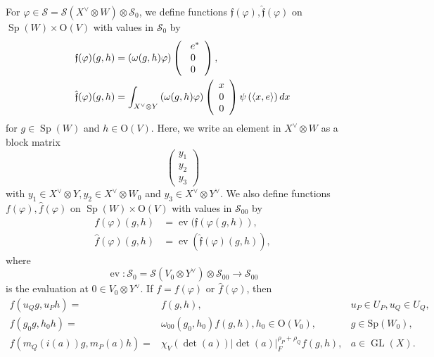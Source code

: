 \documentclass[article]{article}
\numberwithin{equation}{section}
\theoremstyle{definition}
\DeclareMathOperator{\GL}{GL}
\DeclareMathOperator{\SP}{Sp}
\begin{document}
For $\varphi\in \mathscr S =\mathscr S(X^{\vee}\otimes W)\otimes \mathscr S_0$, we define functions $\mathfrak{f}(\varphi), \hat{\mathfrak{f}}(\varphi)$ on $\SP(W)\times \mathrm{O}(V)$ with values in $\mathscr S_0$ by 
\begin{align*}
\mathfrak{f}(\varphi)(g ,h)&=\left(\omega(g,h) \varphi\right)\left(
\begin{array}{c}{\hspace{0.4em}e^*}\\ {0} \\ {0}\end{array}\right),\\
\hat{\mathfrak{f}}(\varphi)(g, h)&=\int_{X^{\vee} \otimes Y}\left(\omega(g ,h) \varphi\right)\left(\begin{array}{c}{x} \\ {0} \\ {0}\end{array}\right) \psi\left(\left\langle x, e\right\rangle\right) d x
\end{align*}
for $g\in \SP(W)$ and $h \in \mathrm{O}(V) $. Here, we write an element in $X^{\vee}\otimes W$ as a block
matrix
$$\left(\begin{array}{l}{y_{1}} \\ {y_{2}} \\ {y_{3}}\end{array}\right)$$
with $y_{1} \in X^{\vee} \otimes Y, y_{2} \in X^{\vee} \otimes W_0$ and $y_{3} \in X^{\vee} \otimes Y^{\vee}$. We also define functions $f(\varphi), \hat f(\varphi)$ on $\SP(W)\times \mathrm {O}(V)$ with values in $\mathscr S_{00}$ by 
$$\begin{aligned} 
f(\varphi)(g,h) &=\operatorname{ev}(\mathfrak{f}\left(\varphi(g, h)\right), \\ \hat{f}(\varphi)(g ,h) &=\operatorname{ev}\left (\hat{\mathfrak{f}}(\varphi)(g, h)\right), \end{aligned}$$
where
$$\operatorname{ev}: \mathscr S_0=\mathscr S(V_0\otimes Y^{\vee})\otimes \mathscr S_{00}\rightarrow \mathscr S_{00}$$
 is the evaluation at $0\in V_0\otimes Y^{\vee}$. If $f=f(\varphi )$ or $\hat f(\varphi)$, then 
 \begin{align*}
 f(u_{Q} g, u_{P} h)=&f(g, h),  &{u_{P} \in U_{P}, u_{Q} \in U_{Q}} ,\\ 
f(g_0g,h_0h) =&\omega_{00}(g_0,h_0) f(g,h),  h_0 \in \mathrm{O}(V_0), &g \in \mathrm{Sp}(W_0), \\ 
f(m_{Q}(i(a)) g, m_{P}(a) h)  =&\chi_{V}(\operatorname{det}(a))|\det(a)|_{F}^{\rho_P+\rho_Q} f\left(g,h\right),   &a \in \GL(X). 
 \end{align*}
\end{document}
